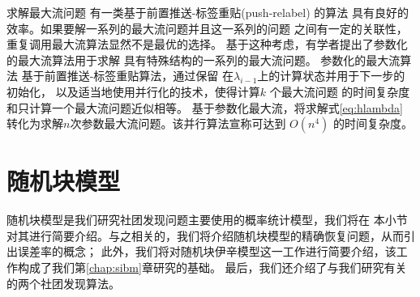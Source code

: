 %
%
%
求解最大流问题
有一类基于前置推送-标签重贴(push-relabel) \cite{Goldberg1988} 的算法
具有良好的效率。如果要解一系列的最大流问题并且这一系列的问题
之间有一定的关联性，重复调用最大流算法显然不是最优的选择。
基于这种考虑，有学者提出了参数化的最大流算法\cite{Gallo1989}用于求解
具有特殊结构的一系列的最大流问题。
%
%
参数化的最大流算法
基于前置推送-标签重贴算法，通过保留
在$\lambda_{i-1}$上的计算状态并用于下一步的初始化，
以及适当地使用并行化的技术，使得计算$k$ 个最大流问题
的时间复杂度和只计算一个最大流问题近似相等。
\citet{kolmogorov} 基于参数化最大流，将求解式\eqref{eq:hlambda}
转化为求解$n$次参数最大流问题。该并行算法宣称可达到 $O(n^4)$ 的时间复杂度。


\section{随机块模型}\label{sec:sbm}
随机块模型是我们研究社团发现问题主要使用的概率统计模型，我们将在
本小节对其进行简要介绍。与之相关的，我们将介绍随机块模型的精确恢复问题，从而引出误差率的概念；
此外，我们将对随机块伊辛模型这一工作进行简要介绍，该工作构成了我们第\ref{chap:sibm}章研究的基础。
最后，我们还介绍了与我们研究有关的两个社团发现算法。

